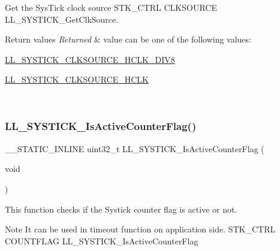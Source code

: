 Get the Sys\+Tick clock source  S\+T\+K\+\_\+\+C\+T\+RL C\+L\+K\+S\+O\+U\+R\+CE L\+L\+\_\+\+S\+Y\+S\+T\+I\+C\+K\+\_\+\+Get\+Clk\+Source. 


\begin{DoxyRetVals}{Return values}
{\em Returned} & value can be one of the following values\+: \begin{DoxyItemize}
\item \hyperlink{group___c_o_r_t_e_x___l_l___e_c___c_l_k_s_o_u_r_c_e___h_c_l_k_gab13c4588c1b1a8b867541a4ad928d205}{L\+L\+\_\+\+S\+Y\+S\+T\+I\+C\+K\+\_\+\+C\+L\+K\+S\+O\+U\+R\+C\+E\+\_\+\+H\+C\+L\+K\+\_\+\+D\+I\+V8} \item \hyperlink{group___c_o_r_t_e_x___l_l___e_c___c_l_k_s_o_u_r_c_e___h_c_l_k_gaa92530d2f2cd8ce785297e4aed960ff0}{L\+L\+\_\+\+S\+Y\+S\+T\+I\+C\+K\+\_\+\+C\+L\+K\+S\+O\+U\+R\+C\+E\+\_\+\+H\+C\+LK} \end{DoxyItemize}
\\
\hline
\end{DoxyRetVals}
\mbox{\label{group___c_o_r_t_e_x___l_l___e_f___s_y_s_t_i_c_k_gaf5dfb37d859552753594f9cc66431ba6}} 
\subsubsection{\texorpdfstring{L\+L\+\_\+\+S\+Y\+S\+T\+I\+C\+K\+\_\+\+Is\+Active\+Counter\+Flag()}{LL\_SYSTICK\_IsActiveCounterFlag()}}
{\footnotesize\ttfamily \+\_\+\+\_\+\+S\+T\+A\+T\+I\+C\+\_\+\+I\+N\+L\+I\+NE uint32\+\_\+t L\+L\+\_\+\+S\+Y\+S\+T\+I\+C\+K\+\_\+\+Is\+Active\+Counter\+Flag (\begin{DoxyParamCaption}\item[{void}]{ }\end{DoxyParamCaption})}



This function checks if the Systick counter flag is active or not. 

\begin{DoxyNote}{Note}
It can be used in timeout function on application side.  S\+T\+K\+\_\+\+C\+T\+RL C\+O\+U\+N\+T\+F\+L\+AG L\+L\+\_\+\+S\+Y\+S\+T\+I\+C\+K\+\_\+\+Is\+Active\+Counter\+Flag 
\end{DoxyNote}

